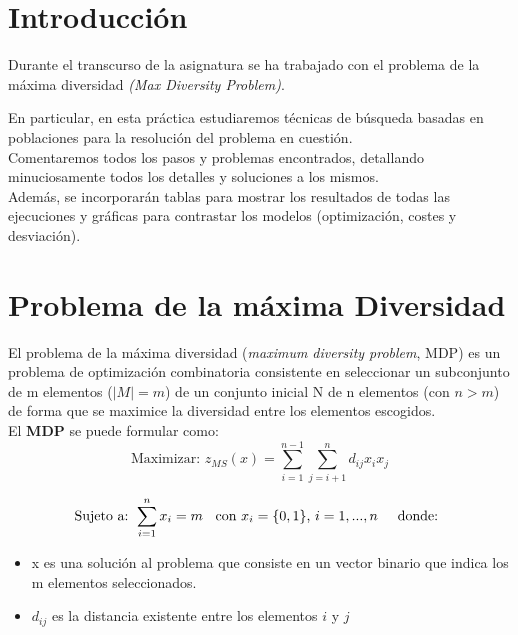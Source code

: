 

\newpage


\section{Introducción}
\hspace{1.5cm} Durante el transcurso de la asignatura se ha trabajado con el problema de la máxima diversidad \textit{(Max Diversity Problem)}. 


En particular, en esta práctica estudiaremos técnicas de búsqueda basadas en poblaciones para la resolución del problema en cuestión. \\
Comentaremos todos los pasos y problemas encontrados, detallando minuciosamente todos los detalles y soluciones a los mismos. \\

Además, se incorporarán tablas para mostrar los resultados de todas las ejecuciones y  gráficas para contrastar los modelos (optimización, costes y desviación).


\section{Problema de la máxima Diversidad}
\hspace{1.5cm} El problema de la máxima diversidad (\textit{maximum diversity problem}, MDP) es un problema de optimización combinatoria consistente en seleccionar un subconjunto de m elementos ($|M|=m$) de un conjunto inicial N de n elementos (con $n>m$) de forma que se maximice la diversidad entre los elementos escogidos. \\


El \textbf{MDP} se puede formular como: \\


\[
\text{Maximizar:   }  z_{MS}(x) = \sum_{i=1}^{n-1} \sum_{j=i+1}^{n} d_{ij}x_i x_j
\]



\[
\text{Sujeto a: } \sum_{i=1}^{n} x_i=m \hspace{0.2cm} \text{ con } x_i=\{0,1\} \text{, } i=1,...,n  \hspace{0.5cm} \text{donde: }
\]


\begin{itemize}
	\item x es una solución al problema que consiste en un vector binario que indica los m elementos seleccionados.
	\item $d_{ij}$ es la distancia existente entre los elementos $i$ y $j$
	
\end{itemize}


